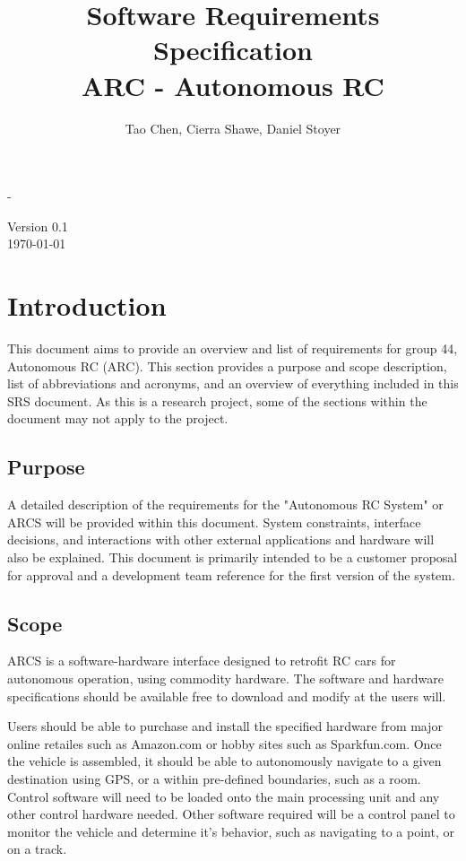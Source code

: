-\documentclass[compsoc,draftclsnofoot,onecolumn,10pt]{IEEEtran}
\date{}
\begin{document}
\begin{titlepage}
	\title{Software Requirements Specification\\
	ARC - Autonomous RC}
	\author{Tao Chen, Cierra Shawe, Daniel Stoyer}
	\maketitle
	\begin{center}
	Version 0.1\\
	\vspace{1.9cm}
	\today
	\end{center}

	\thispagestyle{empty} %
	
\end{titlepage}

\tableofcontents

\newpage

\section{Introduction} %
This document aims to provide an overview and list of requirements for group 44, Autonomous RC (ARC). 
This section provides a purpose and scope description, list of abbreviations and acronyms, and an overview of everything included in this SRS document. 
As this is a research project, some of the sections within the document may not apply to the project. 


\subsection{Purpose} %
A detailed description of the requirements for the "Autonomous RC System" or ARCS will be provided within this document. 
System constraints, interface decisions, and interactions with other external applications and hardware will also be explained. 
This document is primarily intended to be a customer proposal for approval and a development team reference for the first version of the system.

\subsection{Scope} %
ARCS is a software-hardware interface designed to retrofit RC cars for autonomous operation, using commodity hardware. 
The software and hardware specifications should be available free to download and modify at the users will. \par
Users should be able to purchase and install the specified hardware from major online retailes such as Amazon.com or hobby sites such as Sparkfun.com.
Once the vehicle is assembled, it should be able to autonomously navigate to a given destination using GPS, or a within pre-defined boundaries, such as a room.  
Control software will need to be loaded onto the main processing unit and any other control hardware needed. 
Other software required will be a control panel to monitor the vehicle and determine it's behavior, such as navigating to a point, or on a track. 
\end{document}
